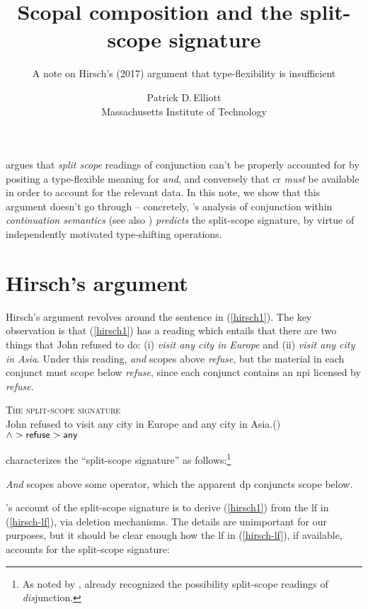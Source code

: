 \documentclass[cronos]{ling-paper}
\title{Scopal composition and the split-scope signature}
\subtitle{A note on Hirsch's (2017) argument that type-flexibility is insufficient}
\author{Patrick D.\,Elliott\\Massachusetts Institute of Technology}
\begin{document}
\maketitle

\citet{hirschThesis} argues that \textit{split scope} readings of conjunction
can't be properly accounted for by positing a type-flexible meaning for
\textit{and}, and conversely that \ac{cr} \textit{must} be available in order to
account for the relevant data. In this note, we show that this argument doesn't
go through -- concretely, \citeauthor{barker2002}'s analysis of conjunction
within \textit{continuation semantics} (see also \citealt[chapter
7]{barkerShan2015}) \textit{predicts} the split-scope signature, by virtue of
independently motivated type-shifting operations.

\section{Hirsch's argument}

Hirsch's argument revolves around the sentence in (\ref{hirsch1}). The key
observation is that (\ref{hirsch1}) has a reading which entails that there are
two things that John refused to do: (i) \textit{visit any city in Europe} and
(ii) \textit{visit any city in Asia}. Under this reading, \textit{and} scopes
above \textit{refuse}, but the material in each conjunct must scope below
\textit{refuse}, since each conjunct contains an \ac{npi} licensed by \textit{refuse}.

\ex \textsc{The split-scope signature}\\
John refused to visit any city in Europe and any city in
Asia.\label{hirsch1}\hfill(\citealt[p.\,90]{hirschThesis})\\
\phantom{,}\hfill $\wedge > \textsf{refuse} > \textsf{any}$
\xe

\citeauthor{hirschThesis} characterizes the \enquote{split-scope signature} as
follows:\footnote{As noted by \citeauthor{hirschThesis}, \citet{parteeRooth}
  already recognized the possibility split-scope readings of \textit{dis}junction.}

\ex
\textit{And} scopes above some operator, which the apparent \ac{dp} conjuncts
scope below.
\xe

\citeauthor{hirschThesis}'s account of the split-scope signature is to derive
(\ref{hirsch1}) from the \ac{lf} in (\ref{hirsch-lf}), via deletion mechanisms.
The details are unimportant for our purposes, but it should be clear enough how
the \ac{lf} in (\ref{hirsch-lf}), if available, accounts for the split-scope signature:
\end{document}
